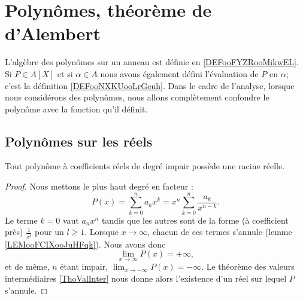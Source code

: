 \section{Polynômes, théorème de d'Alembert}

L'algèbre des polynômes sur un anneau est définie en \ref{DEFooFYZRooMikwEL}. Si \( P\in A[X]\) et si \( \alpha\in A\) nous avons également défini l'évaluation de \( P\) en \( \alpha\); c'est la définition \ref{DEFooNXKUooLrGeuh}. Dans le cadre de l'analyse, lorsque nous considérons des polynômes, nous allons complètement confondre le polynôme avec la fonction qu'il définit.

\subsection{Polynômes sur les réels}

\begin{proposition}     \label{PROPooJKYJooFqbQMr}
    Tout polynôme à coefficients réels de degré impair possède une racine réelle.
\end{proposition}

\begin{proof}
    Nous mettons le plus haut degré en facteur :
    \begin{equation}
        P(x)=\sum_{k=0}^na_kx^k=x^n\sum_{k=0}^n\frac{ a_k }{ x^{n-k} }.
    \end{equation}
    Le terme \( k=0\) vaut \( a_nx^n\) tandis que les autres sont de la forme (à coefficient près) \( \frac{1}{ x^l }\) pour un \( l\geq 1\). Lorsque \( x\to \infty\), chacun de ces termes s'annule (lemme \ref{LEMooFCIXooJuHFqk}). Nous avons donc
    \begin{equation}
        \lim_{x\to \infty} P(x)=+\infty,
    \end{equation}
    et de même, \( n\) étant impair, \( \lim_{x\to -\infty} P(x)=-\infty\). Le théorème des valeurs intermédiaires \ref{ThoValInter} nous donne alors l'existence d'un réel sur lequel \( P\) s'annule.
\end{proof}

